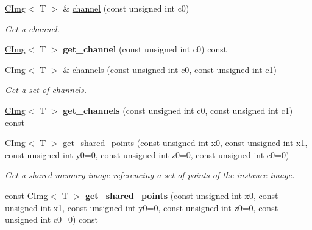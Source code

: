 \begin{DoxyCompactItemize}
\item 
\hypertarget{structcimg__library_1_1CImg_a83af84298188d07c59c49dd0ed4d2714}{
\hyperlink{structcimg__library_1_1CImg}{CImg}$<$ T $>$ \& \hyperlink{structcimg__library_1_1CImg_a83af84298188d07c59c49dd0ed4d2714}{channel} (const unsigned int c0)}
\label{structcimg__library_1_1CImg_a83af84298188d07c59c49dd0ed4d2714}

\begin{DoxyCompactList}\small\item\em Get a channel. \item\end{DoxyCompactList}\item 
\hypertarget{structcimg__library_1_1CImg_a3d7c0ed637ae24e710dc06ce0281c74a}{
\hyperlink{structcimg__library_1_1CImg}{CImg}$<$ T $>$ {\bfseries get\_\-channel} (const unsigned int c0) const }
\label{structcimg__library_1_1CImg_a3d7c0ed637ae24e710dc06ce0281c74a}

\item 
\hypertarget{structcimg__library_1_1CImg_ac51f91d21d960994196ba9f4eacb5bfb}{
\hyperlink{structcimg__library_1_1CImg}{CImg}$<$ T $>$ \& \hyperlink{structcimg__library_1_1CImg_ac51f91d21d960994196ba9f4eacb5bfb}{channels} (const unsigned int c0, const unsigned int c1)}
\label{structcimg__library_1_1CImg_ac51f91d21d960994196ba9f4eacb5bfb}

\begin{DoxyCompactList}\small\item\em Get a set of channels. \item\end{DoxyCompactList}\item 
\hypertarget{structcimg__library_1_1CImg_a21042460a5fab7efdfe45244bf103476}{
\hyperlink{structcimg__library_1_1CImg}{CImg}$<$ T $>$ {\bfseries get\_\-channels} (const unsigned int c0, const unsigned int c1) const }
\label{structcimg__library_1_1CImg_a21042460a5fab7efdfe45244bf103476}

\item 
\hypertarget{structcimg__library_1_1CImg_a7b0c4b800788dfd5de014890778e4ed6}{
\hyperlink{structcimg__library_1_1CImg}{CImg}$<$ T $>$ \hyperlink{structcimg__library_1_1CImg_a7b0c4b800788dfd5de014890778e4ed6}{get\_\-shared\_\-points} (const unsigned int x0, const unsigned int x1, const unsigned int y0=0, const unsigned int z0=0, const unsigned int c0=0)}
\label{structcimg__library_1_1CImg_a7b0c4b800788dfd5de014890778e4ed6}

\begin{DoxyCompactList}\small\item\em Get a shared-\/memory image referencing a set of points of the instance image. \item\end{DoxyCompactList}\item 
\hypertarget{structcimg__library_1_1CImg_afd3af93474a59c32eab9ac55dabc64a4}{
const \hyperlink{structcimg__library_1_1CImg}{CImg}$<$ T $>$ {\bfseries get\_\-shared\_\-points} (const unsigned int x0, const unsigned int x1, const unsigned int y0=0, const unsigned int z0=0, const unsigned int c0=0) const }
\label{structcimg__library_1_1CImg_afd3af93474a59c32eab9ac55dabc64a4}


\end{DoxyCompactItemize}
